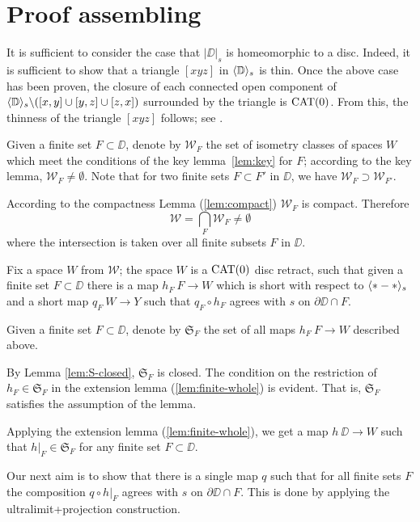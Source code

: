 \section{Proof assembling}\label{Main theorem}



It is sufficient to consider
the case that $|\DD|_s$ is  homeomorphic to a disc.
Indeed, it is sufficient to show that a triangle $[xyz]$ in $\langle\mathbb{D}\rangle_s$ is thin. 
Once the above case has been proven, the closure of each connected open component of $\langle\mathbb{D}\rangle_s\backslash ([x,y]\cup[y,z]\cup[z,x])$
surrounded by the triangle is $\mathop{\rm CAT}\nolimits(0)$.
From this, the thinness of the triangle $[xyz]$ follows; see \cite{bishop}.

Given a finite set $F\subset \DD$,
denote by $\mathcal{W}_F$
the set of isometry classes of spaces $W$ which meet the conditions of the key lemma~\ref{lem:key}
for $F$;
according to the key lemma, $\mathcal{W}_F\ne\emptyset$.
Note that for two finite sets $F\subset F'$ in $\DD$,
we have $\mathcal{W}_F\supset \mathcal{W}_{F'}$.

According to the compactness Lemma (\ref{lem:compact}) $\mathcal{W}_F$ is compact.
Therefore 
\[\mathcal{W}
=
\bigcap_{F}\mathcal{W}_F\ne \emptyset\]
where the intersection is taken over all finite subsets $F$ in $\DD$. 


Fix a space $W$ from $\mathcal{W}$;
the space $W$ is a $\mathop{\rm CAT}\nolimits(0)$ disc retract,
such that given a finite set $F\subset \DD$ there is a map $h_F\:F\to W$ which is short with 
respect to $\langle{*}-{*}\rangle_s$ 
and a short map $q_F\:W\to Y$ such that $q_F\circ h_F$ agrees with $s$ on $\partial\DD\cap F$.

Given a finite set $F\subset \DD$,
denote by $\mathfrak{S}_F$ the set of all maps $h_F\:F\to W$ described above.

By Lemma \ref{lem:S-closed}, $\mathfrak{S}_F$ is closed.
The condition on the restriction of $h_F\in  \mathfrak{S}_F$ in the extension lemma (\ref{lem:finite-whole}) is evident.
That is, $\mathfrak{S}_F$ satisfies the assumption of the lemma.

Applying the extension lemma (\ref{lem:finite-whole}),
we get a map $h\:\DD\to W$ such that $h|_F\in \mathfrak{S}_F$
for any finite set $F\subset \DD$.

Our next aim is to show that there is a single map $q$ such that
for all finite sets $F$ the composition $q\circ h|_F$ agrees with
$s$ on $\partial\DD\cap F$.
This is done by applying the ultralimit+projection construction.

